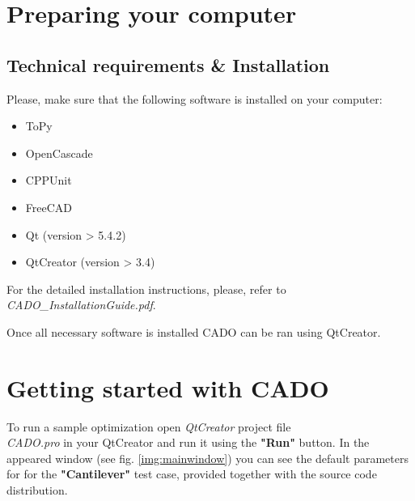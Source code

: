 \documentclass[
12pt, %
a4paper, %
oneside, %
headinclude,footinclude, %
BCOR5mm, %
]{scrartcl}
\begin{document}

\newpage %


\section{Preparing your computer}
\subsection{Technical requirements \& Installation}
Please, make sure that the following software is installed on your computer:
\begin{itemize}
\item ToPy
\item OpenCascade
\item CPPUnit
\item FreeCAD
\item Qt (version > 5.4.2)
\item QtCreator (version > 3.4) 
\end{itemize}

For the detailed installation instructions, please, refer to \\ \textit{CADO\_InstallationGuide.pdf}.

Once all necessary software is installed CADO can be ran using QtCreator.


\section{Getting started with CADO}

To run a sample optimization open \textit{QtCreator} project file \\ \textit{CADO.pro} in your QtCreator and run it using the \textbf{"Run"} button. In the appeared window (see fig. \ref{img:mainwindow}) you can see the default parameters for for the \textbf{"Cantilever"} test case, provided together with the source code distribution. 
\end{document}
